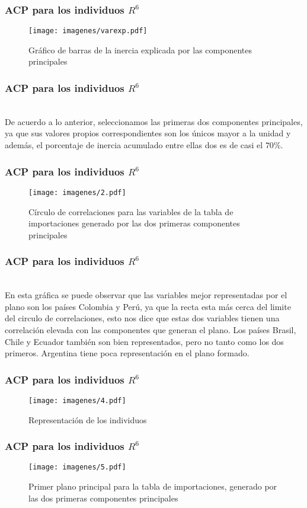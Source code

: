 \documentclass[12pt]{beamer}
\begin{document}
\begin{frame}
\frametitle{ACP para los individuos $R^6$}
\begin{figure}[h]
  \centering
  \texttt{[image: imagenes/varexp.pdf]}
  \caption{Gráfico de barras de la inercia explicada por las componentes principales}\label{figura1}
\end{figure}
\end{frame}

\begin{frame}
\frametitle{ACP para los individuos $R^6$}
~\\De acuerdo a lo anterior, seleccionamos las primeras dos componentes principales, ya que sus valores propios correspondientes son los únicos mayor a la unidad y además, el porcentaje de inercia acumulado entre ellas dos es de casi el $70\%$.
\end{frame}

\begin{frame}
\frametitle{ACP para los individuos $R^6$}
\begin{figure}[h]
  \centering
  \texttt{[image: imagenes/2.pdf]}
  \caption{Círculo de correlaciones para las variables de la tabla de importaciones generado por las dos
primeras componentes principales}\label{figura1}
\end{figure}
\end{frame}

\begin{frame}
\frametitle{ACP para los individuos $R^6$}
~\\En esta gráfica se puede observar que las variables mejor representadas por el plano son los países Colombia y Perú, ya que la recta esta más cerca del limite del circulo de correlaciones, esto nos dice que estas dos variables tienen una correlación elevada con las componentes que generan el plano. Los países Brasil, Chile y Ecuador también son bien representados, pero no tanto como los dos primeros. Argentina tiene poca representación en el plano formado.
\end{frame}

\begin{frame}
\frametitle{ACP para los individuos $R^6$}
\begin{figure}[h!]
  \centering
  \texttt{[image: imagenes/4.pdf]}
  \caption{Representación de los individuos}\label{figura1}
\end{figure}
\end{frame}

\begin{frame}
\frametitle{ACP para los individuos $R^6$}
\begin{figure}[h]
  \centering
  \texttt{[image: imagenes/5.pdf]}
  \caption{Primer plano principal para la tabla de importaciones, generado por las dos
primeras componentes principales}\label{figura1}
\end{figure}
\end{frame}
\end{document}
